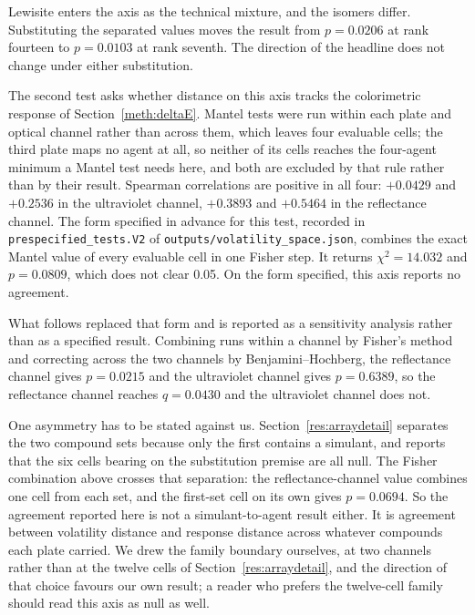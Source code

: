 \documentclass[11pt,a4paper]{article}
\begin{document}
Lewisite enters the axis as the technical mixture, and the isomers differ.
Substituting the separated values moves the result from $p = 0.0206$ at rank
fourteen to $p = 0.0103$ at rank seventh. The direction of the headline does not
change under either substitution.

The second test asks whether distance on this axis tracks the colorimetric
response of Section~\ref{meth:deltaE}. Mantel tests were run within each plate
and optical channel rather than across them, which leaves four evaluable cells;
the third plate maps no agent at all, so neither of its cells reaches the
four-agent minimum a Mantel test needs here, and both are excluded by that rule
rather than by their result. Spearman correlations are positive in all
four: $+0.0429$ and $+0.2536$ in the ultraviolet channel, $+0.3893$ and
$+0.5464$ in the reflectance channel. The form specified in advance for this
test, recorded in \texttt{prespecified\_tests.V2} of
\texttt{outputs/volatility\_space.json}, combines the exact Mantel value of
every evaluable cell in one Fisher step. It returns $\chi^2 = 14.032$ and
$p = 0.0809$, which does not clear 0.05. On the form specified, this axis
reports no agreement.

What follows replaced that form and is reported as a sensitivity analysis
rather than as a specified result. Combining runs within a channel by
Fisher's method and correcting across the two channels by Benjamini--Hochberg,
the reflectance channel gives $p = 0.0215$ and the ultraviolet channel gives
$p = 0.6389$, so the reflectance
channel reaches $q = 0.0430$ and the ultraviolet channel does not.

One asymmetry has to be stated against us. Section~\ref{res:arraydetail}
separates the two compound sets because only the first contains a simulant, and
reports that the six cells bearing on the substitution premise are all null. The
Fisher combination above crosses that separation: the reflectance-channel value
combines one cell from each set, and the first-set cell on its own gives
$p = 0.0694$. So the agreement reported here is not a simulant-to-agent result
either. It is agreement between volatility distance and response distance across
whatever compounds each plate carried. We drew the family boundary ourselves, at
two channels rather than at the twelve cells of
Section~\ref{res:arraydetail}, and the direction of that choice favours our own
result; a reader who prefers the twelve-cell family should read this axis as
null as well.
\end{document}

